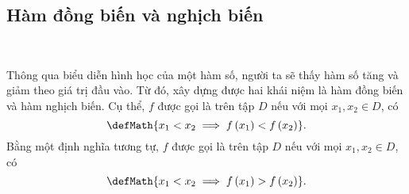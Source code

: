 \subsection{Hàm đồng biến và nghịch biến}

\ %

Thông qua biểu diễn hình học của một hàm số, người ta sẽ thấy hàm số tăng và giảm theo giá trị đầu vào. Từ đó, xây dựng được hai khái niệm là hàm đồng biến và hàm nghịch biến. Cụ thể, $f$ được gọi là  trên tập $D$ nếu với mọi $x_1, x_2 \in D$, có $$\defMath{x_1 < x_2 \implies f\left(x_1\right) < f\left(x_2\right)}.$$ Bằng một định nghĩa tương tự, $f$ được gọi là  trên tập $D$ nếu với mọi $x_1, x_2 \in D$, có $$\defMath{x_1 < x_2 \implies f\left(x_1\right) > f\left(x_2\right)}.$$ 

